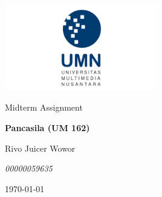 \documentclass[
  12pt,
  answers  
]{exam}
\newcommand{\mytitle}{Pancasila (UM 162)}
\newcommand{\theauthor}{Rivo Juicer Wowor}
\newcommand{\affiliation}{00000059635}
\begin{document}
	\begin{titlepage}
		\centering
		\vspace{2cm}
		\includegraphics[width=0.5\textwidth]{../../ref/logoUMN.png}\par\vspace{1cm}
		\vspace{1.5cm}
		\large{Midterm Assignment} \par
		\vspace{1cm}
		\LARGE{\textbf{\mytitle}} \par
		\vspace{1.5cm}
		\large{\theauthor} \par
		\small{\emph{\affiliation}} \par
		\vfill
		\today
		\end{titlepage}	
\end{document}

